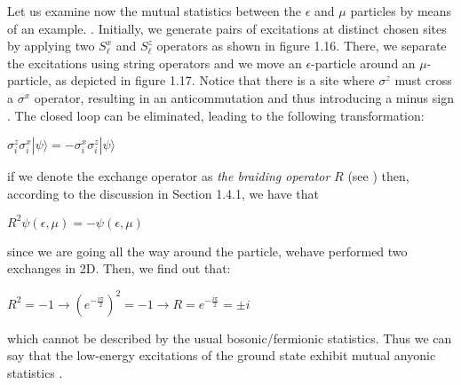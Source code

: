 \documentclass{Configuration_Files/PoliMi3i_thesis}
\begin{document}
Let us examine now the mutual statistics between the $\epsilon$ and $\mu$ particles by means of an example. \cite{Rao16}. Initially, we generate pairs of excitations at distinct chosen sites by applying two $S^x_{\ell}$ and $S^z_{\ell}$ operators as shown in figure 1.16. There, we separate the excitations using string operators and we move an $\epsilon$-particle around an $\mu$-particle, as depicted in figure 1.17. Notice that there is a site where $\sigma^z$ must cross a $\sigma^x$ operator, resulting in an anticommutation and thus introducing a minus sign {\cite{Kit02}}.
The closed loop can be eliminated, leading to the following transformation:

\begin{center}
	$\sigma_i^z\sigma_i^x|\psi\rangle = - \sigma_i^x\sigma_i^z|\psi\rangle$
\end{center}

if we denote the exchange operator as {\it the braiding operator} $R$ (see \cite{Rao16}) then, according to the discussion in Section 1.4.1, we have that

\begin{center}
	$R^2\psi(\epsilon,\mu) = - \psi(\epsilon,\mu)$
\end{center}

since we are going all the way around the particle, wehave performed two exchanges in 2D. Then, we find out that:

\begin{center}
	$R^2 = - 1 \rightarrow ( e^{-\frac{i\pi}{2}})^2 = - 1  \rightarrow R = e^{-\frac{i\pi}{2}} = \pm i $
\end{center}

which cannot be described by the usual bosonic/fermionic statistics. Thus we can say that the low-energy excitations of the ground state exhibit mutual anyonic statistics \cite{Rao01,Kha98}.
\end{document}
